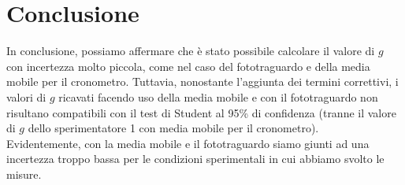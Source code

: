 \section{Conclusione}
In conclusione, possiamo affermare che è stato possibile calcolare il valore di $g$ con incertezza molto piccola, come nel caso del fototraguardo e della media mobile per il cronometro. Tuttavia, nonostante l’aggiunta dei termini correttivi, i valori di $g$ ricavati facendo uso della media mobile e con il fototraguardo non risultano compatibili con il test di Student al 95\% di confidenza (tranne il valore di $g$ dello sperimentatore 1 con media mobile per il cronometro).\\
Evidentemente, con la media mobile e il fototraguardo siamo giunti ad una incertezza troppo bassa per le condizioni sperimentali in cui abbiamo svolto le misure. \\